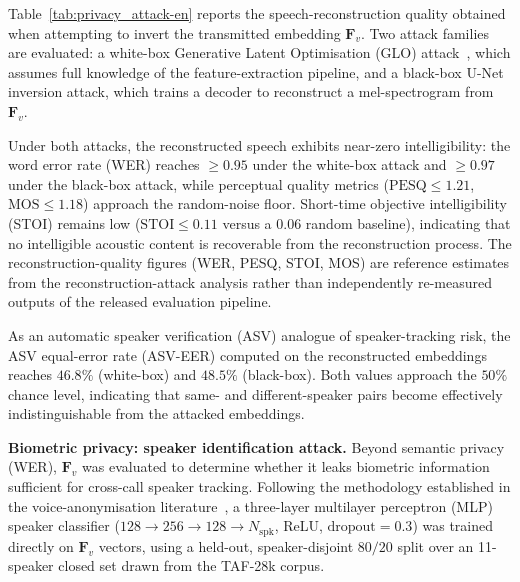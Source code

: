 \documentclass[a4paper,fleqn]{cas-sc}
\begin{document}
Table~\ref{tab:privacy_attack-en} reports the speech-reconstruction quality obtained when attempting to invert the transmitted embedding $\bm{F}_v$. Two attack families are evaluated: a white-box Generative Latent Optimisation (GLO) attack~\citep{23}, which assumes full knowledge of the feature-extraction pipeline, and a black-box U-Net inversion attack, which trains a decoder to reconstruct a mel-spectrogram from $\bm{F}_v$.

Under both attacks, the reconstructed speech exhibits near-zero intelligibility: the word error rate (WER) reaches $\ge 0.95$ under the white-box attack and $\ge 0.97$ under the black-box attack, while perceptual quality metrics ($\mathrm{PESQ} \le 1.21$, $\mathrm{MOS} \le 1.18$) approach the random-noise floor. Short-time objective intelligibility (STOI) remains low ($\mathrm{STOI} \le 0.11$ versus a $0.06$ random baseline), indicating that no intelligible acoustic content is recoverable from the reconstruction process. The reconstruction-quality figures (WER, PESQ, STOI, MOS) are reference estimates from the reconstruction-attack analysis rather than independently re-measured outputs of the released evaluation pipeline.

As an automatic speaker verification (ASV) analogue of speaker-tracking risk, the ASV equal-error rate (ASV-EER) computed on the reconstructed embeddings reaches $46.8\%$ (white-box) and $48.5\%$ (black-box). Both values approach the $50\%$ chance level, indicating that same- and different-speaker pairs become effectively indistinguishable from the attacked embeddings.

\medskip
\noindent\textbf{Biometric privacy: speaker identification attack.}
Beyond semantic privacy (WER), $\mathbf{F}_v$ was evaluated to determine whether it leaks biometric information sufficient for cross-call speaker tracking. Following the methodology established in the voice-anonymisation literature~\citep{22}, a three-layer multilayer perceptron (MLP) speaker classifier ($128 \to 256 \to 128 \to N_{\text{spk}}$, ReLU, $\text{dropout}=0.3$) was trained directly on $\mathbf{F}_v$ vectors, using a held-out, speaker-disjoint $80/20$ split over an 11-speaker closed set drawn from the TAF-28k corpus.
\end{document}
